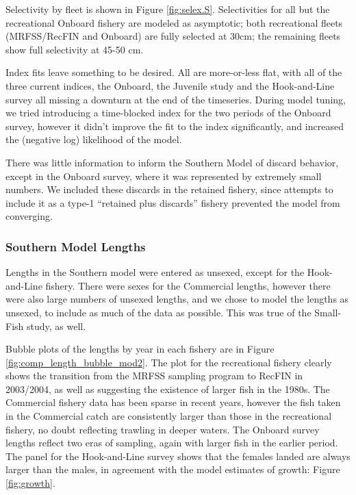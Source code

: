 \documentclass[12pt,]{article}
\begin{document}
Selectivity by fleet is shown in Figure \ref{fig:selex.S}. Selectivities
for all but the recreational Onboard fishery are modeled as asymptotic;
both recreational fleets (MRFSS/RecFIN and Onboard) are fully selected
at 30cm; the remaining fleets show full selectivity at 45-50 cm.

Index fits leave something to be desired. All are more-or-less flat,
with all of the three current indices, the Onboard, the Juvenile study
and the Hook-and-Line survey all missing a downturn at the end of the
timeseries. During model tuning, we tried introducing a time-blocked
index for the two periods of the Onboard survey, however it didn't
improve the fit to the index significantly, and increased the (negative
log) likelihood of the model.

There was little information to inform the Southern Model of discard
behavior, except in the Onboard survey, where it was represented by
extremely small numbers. We included these discards in the retained
fishery, since attempts to include it as a type-1 ``retained plus
discards'' fishery prevented the model from converging.

\subsubsection{Southern Model Lengths}\label{southern-model-lengths}

Lengths in the Southern model were entered as unsexed, except for the
Hook-and-Line fishery. There were sexes for the Commercial lengths,
however there were also large numbers of unsexed lengths, and we chose
to model the lengths as unsexed, to include as much of the data as
possible. This was true of the Small-Fish study, as well.

Bubble plots of the lengths by year in each fishery are in Figure
\ref{fig:comp_length_bubble_mod2}. The plot for the recreational fishery
clearly shows the transition from the MRFSS sampling program to RecFIN
in 2003/2004, as well as suggesting the existence of larger fish in the
1980s. The Commercial fishery data has been sparse in recent years,
however the fish taken in the Commercial catch are consistently larger
than those in the recreational fishery, no doubt reflecting trawling in
deeper waters. The Onboard survey lengths reflect two eras of sampling,
again with larger fish in the earlier period. The panel for the
Hook-and-Line survey shows that the females landed are always larger
than the males, in agreement with the model estimates of growth: Figure
\ref{fig:growth}.
\end{document}

